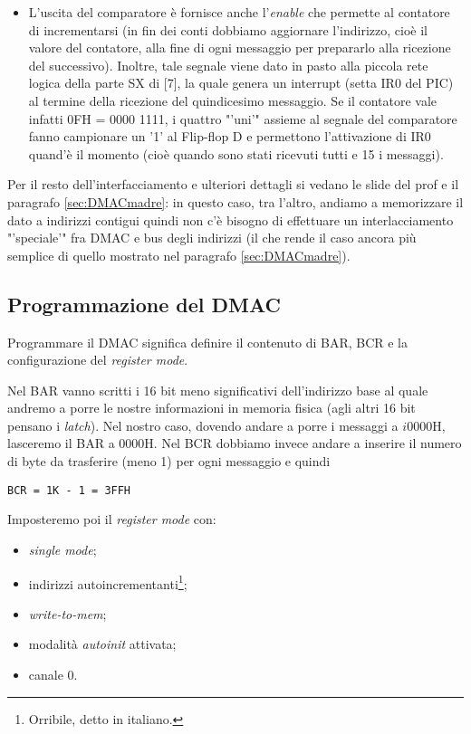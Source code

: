 \begin{itemize}
\item L'uscita del comparatore è fornisce anche l'\textit{enable} che permette al contatore di incrementarsi (in fin dei conti dobbiamo aggiornare l'indirizzo, cioè il valore del contatore, alla fine di ogni messaggio per prepararlo alla ricezione del successivo). Inoltre, tale segnale viene dato in pasto alla piccola rete logica della parte SX di [7], la quale genera un interrupt (setta IR0 del PIC) al termine della ricezione del quindicesimo messaggio. Se il contatore vale infatti 0FH = 0000 1111, i quattro "'uni'" assieme al segnale del comparatore fanno campionare un '1' al Flip-flop D e permettono l'attivazione di IR0 quand'è il momento (cioè quando sono stati ricevuti tutti e 15 i messaggi).

\end{itemize}

Per il resto dell'interfacciamento e ulteriori dettagli si vedano le slide del prof e il paragrafo \ref{sec:DMACmadre}: in questo caso, tra l'altro, andiamo a memorizzare il dato a indirizzi contigui quindi non c'è bisogno di effettuare un interlacciamento "'speciale'" fra DMAC e bus degli indirizzi (il che rende il caso ancora più semplice di quello mostrato nel paragrafo \ref{sec:DMACmadre}).

\subsection{Programmazione del DMAC}

Programmare il DMAC significa definire il contenuto di BAR, BCR e la configurazione del \textit{register mode}.

Nel BAR vanno scritti i 16 bit meno significativi dell'indirizzo base al quale andremo a porre le nostre informazioni in memoria fisica (agli altri 16 bit pensano i \textit{latch}).
Nel nostro caso, dovendo andare a porre i messaggi a $i0000$H, lasceremo il BAR a 0000H.
Nel BCR dobbiamo invece andare a inserire il numero di byte da trasferire (meno 1) per ogni messaggio e quindi
\begin{verbatim}
BCR = 1K - 1 = 3FFH
\end{verbatim}

Imposteremo poi il \textit{register mode} con: 
\begin{itemize}
\item \textit{single mode};
\item indirizzi autoincrementanti\footnote{Orribile, detto in italiano.};
\item \textit{write-to-mem};
\item modalità \textit{autoinit} attivata;
\item canale 0.
\end{itemize}

